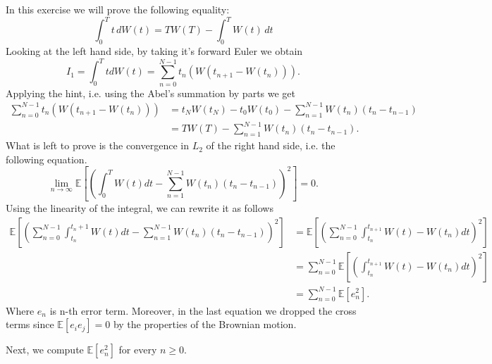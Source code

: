 \documentclass[a4paper,12pt]{article} %
\begin{document}
\subsection{}
In this exercise we will prove the following equality:
\begin{equation}
    \int_0^T t \, dW(t) = T W(T) - \int_0^T W(t) \, dt
\end{equation}
Looking at the left hand side, by taking it's forward Euler we obtain
\begin{equation}
    I_1 = \int _0^T t dW(t) = \sum_{n=0}^{N-1} t_n (W(t_{n+1} -W(t_n) )).
\end{equation}
Applying the hint, i.e. using the Abel's summation by parts we get
\begin{align*}
    \sum_{n=0}^{N-1} t_n (W(t_{n+1} -W(t_n) )) & = t_N W(t_N) - t_0 W(t_0) - \sum_{n=1}^{N-1} W(t_n) (t_n - t_{n-1}) \\
                                               & = T W(T)  - \sum_{n=1}^{N-1} W(t_n) (t_n - t_{n-1}).
\end{align*}
What is left to prove is the convergence in \(L_2\) of the right hand side, i.e. the following equation.
\begin{equation}
    \lim_{n \to \infty} \mathbb{E} \left[ \left(   \int _0^T W(t)dt-\sum_{n=1}^{N-1} W(t_n) (t_n - t_{n-1})  \right)^2\right] =0.
\end{equation}
Using the linearity of the integral, we can rewrite it as follows
\begin{align*}
    \mathbb{E} \left[ \left( \sum_{n=0}^{N-1}  \int _{t_{n}}^{t_n+1} W(t)dt-\sum_{n=1}^{N-1} W(t_n) (t_n - t_{n-1}) \right) ^2  \right] & = \mathbb{E} \left[ \left(   \sum_{n=0}^{N-1}  \int _{t_{n}}^{t_{n+1}} W(t)-W(t_n)dt  \right)^2 \right] \\
                                                                                                                                      & =\sum_{n=0}^{N-1} \mathbb{E} \left[ \left(     \int _{t_{n}}^{t_{n+1}} W(t)-W(t_n) dt \right)^2\right]  \\
                                                                                                                                      & = \sum_{n=0}^{N-1} \mathbb{E} \left[  e_n ^2 \right].
\end{align*}
Where \(e_n\) is n-th error term. Moreover, in the last equation we dropped the cross terms  since \(\mathbb{E} \left[ e_i e_j \right] = 0 \) by the properties of the Brownian motion.

Next, we compute \(\mathbb{E} \left[ e_n^2 \right]\) for every \(n \geq 0\).
\end{document}

